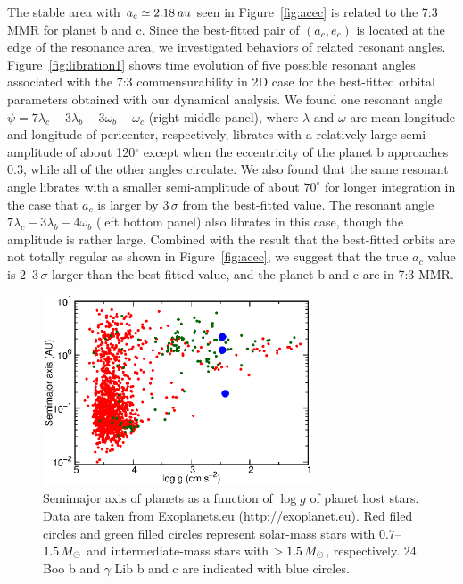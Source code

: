 \documentclass[]{pasj01}
\begin{document}
The stable area with $a_c \simeq 2.18\>{\rm au}$ seen in Figure~\ref{fig:acec} is related to the 7:3 MMR for planet b and c. 
Since the best-fitted pair of $(a_c, e_c)$ is located at the edge of the resonance area, we investigated behaviors of related resonant angles. 
Figure~\ref{fig:libration1} shows time evolution of five possible resonant angles associated with the 7:3 commensurability in 2D case for the best-fitted orbital parameters obtained with our dynamical analysis. 
We found one resonant angle $\psi = 7\lambda_c - 3\lambda_b - 3\omega_b - \omega_c$ (right middle panel), 
where $\lambda$ and $\omega$ are mean longitude and longitude of pericenter, respectively, 
librates with a relatively large semi-amplitude of about 120$^{\circ}$ except when the eccentricity of the planet b approaches 0.3, while all of the other angles circulate.
We also found that the same resonant angle librates with a smaller semi-amplitude of about $70^{\circ}$ for longer integration in the case that $a_c$ is larger by $3\,\sigma$ from the best-fitted value. 
The resonant angle $7\lambda_c - 3\lambda_b - 4\omega_b$ (left bottom panel) also librates in this case, though the amplitude is rather large.
Combined with the result that the best-fitted orbits are not totally regular as shown in Figure~\ref{fig:acec}, we suggest that the true $a_c$ value is $2$--$3\,\sigma$ larger than the best-fitted value, and the planet b and c are in 7:3 MMR.
\begin{figure}
\begin{center}
\includegraphics[width=8cm]{re_logg_a.v2.eps}
\end{center}
\caption{
Semimajor axis of planets as a function of $\log g$ of planet host stars. Data are taken from Exoplanets.eu (http://exoplanet.eu).
Red filed circles and green filled circles represent solar-mass stars with $0.7$--$1.5\,M_{\Sol}$ and intermediate-mass stars with $>1.5\,M_{\Sol}$, respectively.
24 Boo b and $\gamma$ Lib b and c are indicated with blue circles.}
\label{re_logg_a}
\end{figure}
\end{document}
